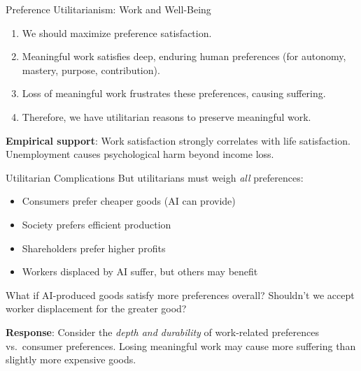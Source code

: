 ﻿\documentclass[aspectratio=169,11pt]{beamer}
\begin{document}
\begin{frame}{Preference Utilitarianism: Work and Well-Being}
\begin{probox}
\small
\begin{enumerate}
    \item We should maximize preference satisfaction.
    \item Meaningful work satisfies deep, enduring human preferences (for autonomy, mastery, purpose, contribution).
    \item Loss of meaningful work frustrates these preferences, causing suffering.
    \item Therefore, we have utilitarian reasons to preserve meaningful work.
\end{enumerate}
\end{probox}

\vspace{0.2em}
\textbf{Empirical support}: Work satisfaction strongly correlates with life satisfaction. Unemployment causes psychological harm beyond income loss.
\end{frame}

\begin{frame}{Utilitarian Complications}
But utilitarians must weigh \emph{all} preferences:
\begin{itemize}
    \item Consumers prefer cheaper goods (AI can provide)
    \item Society prefers efficient production
    \item Shareholders prefer higher profits
    \item Workers displaced by AI suffer, but others may benefit
\end{itemize}

\vspace{0.2em}
\begin{objectionbox}[Objection]
\small
What if AI-produced goods satisfy more preferences overall? Shouldn't we accept worker displacement for the greater good?
\end{objectionbox}

\vspace{0.2em}
\textbf{Response}: Consider the \emph{depth and durability} of work-related preferences vs.\ consumer preferences. Losing meaningful work may cause more suffering than slightly more expensive goods.
\end{frame}
\end{document}
